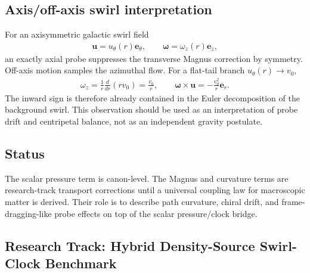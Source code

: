 \subsection{Axis/off-axis swirl interpretation}
    For an axisymmetric galactic swirl field
    \begin{align}
        \mathbf{u}=u_\theta(r)\mathbf{e}_\theta,
        \qquad
        \boldsymbol{\omega}=\omega_z(r)\mathbf{e}_z,
    \end{align}
    an exactly axial probe suppresses the transverse Magnus correction by symmetry.
    Off-axis motion samples the azimuthal flow. For a flat-tail branch
    \(u_\theta(r)\to v_0\),
    \begin{align}
        \omega_z
        =
        \frac{1}{r}\frac{d}{dr}\left(r v_0\right)
        =
        \frac{v_0}{r},
        \qquad
        \boldsymbol{\omega}\times\mathbf{u}
        =
        -\frac{v_0^2}{r}\mathbf{e}_r.
    \end{align}
    The inward sign is therefore already contained in the Euler decomposition of
    the background swirl. This observation should be used as an interpretation of
    probe drift and centripetal balance, not as an independent gravity postulate.

\subsection{Status}
    The scalar pressure term is canon-level. The Magnus and curvature terms are
    research-track transport corrections until a universal coupling law for
    macroscopic matter is derived. Their role is to describe path curvature,
    chiral drift, and frame-dragging-like probe effects on top of the scalar
    pressure/clock bridge.
    
    


\subsection{Research Track: Hybrid Density-Source Swirl-Clock Benchmark}
\label{app:research_hybrid_density_source_swirl_clock}

